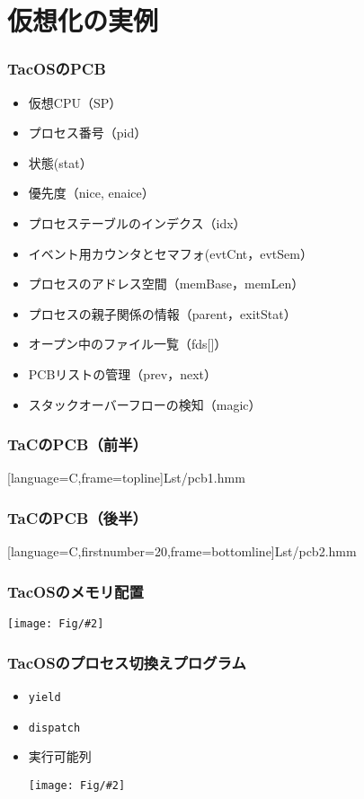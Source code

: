 \documentclass[dvipdfmx]{beamer}
\newcommand{\fig}[2]{\begin{center}\texttt{[image: Fig/\#2]}\end{center}}
\begin{document}
\section{仮想化の実例}
\begin{frame}
  \frametitle{TacOSのPCB}
  \begin{itemize}
    \item 仮想CPU（SP）
    \item プロセス番号（pid）
    \item 状態(stat）
    \item 優先度（nice, enaice）
    \item プロセステーブルのインデクス（idx）
    \item イベント用カウンタとセマフォ(evtCnt，evtSem）
    \item プロセスのアドレス空間（memBase，memLen）
    \item プロセスの親子関係の情報（parent，exitStat）
    \item オープン中のファイル一覧（fds[]）
    \item PCBリストの管理（prev，next）
    \item スタックオーバーフローの検知（magic）
  \end{itemize}
\end{frame}

\begin{frame}[fragile]
  \frametitle{TaCのPCB（前半）}
  
      [language={C},frame=topline]{Lst/pcb1.hmm}
\end{frame}

\begin{frame}[fragile]
  \frametitle{TaCのPCB（後半）}
  
      [language={C},firstnumber=20,frame=bottomline]{Lst/pcb2.hmm}
\end{frame}

\begin{frame}
  \frametitle{TacOSのメモリ配置}
  \fig{scale=0.4}{tacosMemMap-crop.pdf}
\end{frame}

\begin{frame}
  \frametitle{TacOSのプロセス切換えプログラム}
  \begin{itemize}
    \item {\tt yield}
    \item {\tt dispatch}
    \item 実行可能列
      \fig{scale=0.5}{tacosReadyQueue-crop.pdf}
  \end{itemize}
\end{frame}
\end{document}
